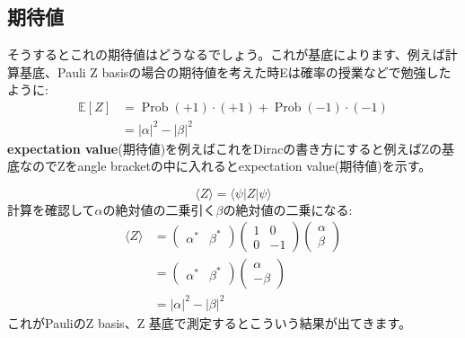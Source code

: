 \subsection{期待値}
そうするとこれの期待値はどうなるでしょう。これが基底によります、例えば計算基底、Pauli Z basisの場合の期待値を考えた時Eは確率の授業などで勉強したように:
\begin{equation}
\begin{aligned}
\mathbb{E}[Z] &=\operatorname{Prob}(+1) \cdot(+1)+\operatorname{Prob}(-1) \cdot(-1) \\
&=|\alpha|^{2}-|\beta|^{2}
\end{aligned}
\end{equation}
\textbf{expectation value}(期待値)を例えばこれをDiracの書き方にすると例えばZの基底なのでZをangle bracketの中に入れるとexpectation value(期待値)を示す。

\begin{equation}
\langle Z\rangle=\langle\psi|Z| \psi\rangle
\end{equation}
計算を確認して$\alpha$の絶対値の二乗引く$\beta$の絶対値の二乗になる:
\begin{equation}
\begin{aligned}
\langle Z\rangle &=\left(\begin{array}{ll}
\alpha^{*} & \beta^{*}
\end{array}\right)\left(\begin{array}{cc}
1 & 0 \\
0 & -1
\end{array}\right)\left(\begin{array}{l}
\alpha \\
\beta
\end{array}\right) \\
&=\left(\begin{array}{ll}
\alpha^{*} & \beta^{*}
\end{array}\right)\left(\begin{array}{c}
\alpha \\
-\beta
\end{array}\right) \\
&=|\alpha|^{2}-|\beta|^{2}
\end{aligned}
\end{equation}
これがPauliのZ basis、Z 基底で測定するとこういう結果が出てきます。
